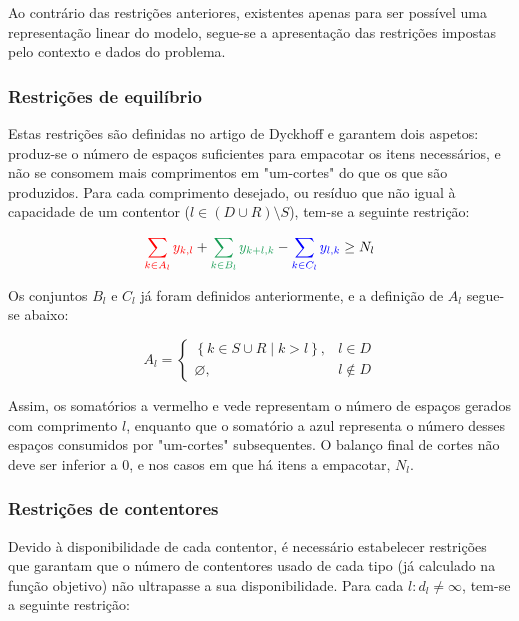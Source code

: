 \documentclass[12pt, a4paper, titlepage]{article}
\begin{document}
Ao contrário das restrições anteriores, existentes apenas para ser possível uma representação linear
do modelo, segue-se a apresentação das restrições impostas pelo contexto e dados do problema.

\subsubsection{Restrições de equilíbrio}

Estas restrições são definidas no artigo de Dyckhoff \cite{dyckhoff} e garantem dois aspetos:
produz-se o número de espaços suficientes para empacotar os itens necessários, e não se consomem
mais comprimentos em "um-cortes"{} do que os que são produzidos. Para cada comprimento desejado, ou
resíduo que não igual à capacidade de um contentor ($l \in (D \cup R) \setminus S$), tem-se a
seguinte restrição:

\begin{equation}
    {\color{red} \sum_{k \in A_l} y_{k, l}} +
    {\color{ForestGreen} \sum_{k \in B_l} y_{k + l, k}} -
    {\color{blue} \sum_{k \in C_l} y_{l, k}} \geq N_l
    \label{eq:balance-restriction}
\end{equation}

Os conjuntos $B_l$ e $C_l$ já foram definidos anteriormente, e a definição de $A_l$ segue-se abaixo:

\begin{equation}
    A_l =
    \begin{cases}
        \left \{ k \in S \cup R \mid k > l \right \}, & l \in D \\
        \varnothing, & l \not \in D
    \end{cases}
\end{equation}

Assim, os somatórios a {\color{red} vermelho} e {\color{ForestGreen} vede} representam o número de
espaços gerados com comprimento $l$, enquanto que o somatório a {\color{blue} azul} representa o
número desses espaços consumidos por "um-cortes"{} subsequentes. O balanço final de cortes não deve
ser inferior a $0$, e nos casos em que há itens a empacotar, $N_l$.

\subsubsection{Restrições de contentores}

Devido à disponibilidade de cada contentor, é necessário estabelecer restrições que garantam que o
número de contentores usado de cada tipo (já calculado na função objetivo) não ultrapasse a sua
disponibilidade. Para cada $l: d_l \not = \infty$, tem-se a seguinte restrição:
\end{document}
